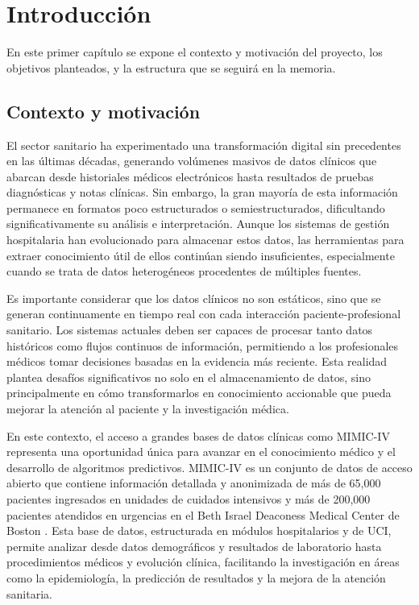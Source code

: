 \chapter{Introducción}

En este primer capítulo se expone el contexto y motivación del proyecto, los objetivos planteados, y la estructura que se seguirá en la memoria.

\section{Contexto y motivación}

El sector sanitario ha experimentado una transformación digital sin precedentes en las últimas décadas, generando volúmenes masivos de datos clínicos que abarcan desde historiales médicos electrónicos hasta resultados de pruebas diagnósticas y notas clínicas. Sin embargo, la gran mayoría de esta información permanece en formatos poco estructurados o semiestructurados, dificultando significativamente su análisis e interpretación. Aunque los sistemas de gestión hospitalaria han evolucionado para almacenar estos datos, las herramientas para extraer conocimiento útil de ellos continúan siendo insuficientes, especialmente cuando se trata de datos heterogéneos procedentes de múltiples fuentes.

Es importante considerar que los datos clínicos no son estáticos, sino que se generan continuamente en tiempo real con cada interacción paciente-profesional sanitario. Los sistemas actuales deben ser capaces de procesar tanto datos históricos como flujos continuos de información, permitiendo a los profesionales médicos tomar decisiones basadas en la evidencia más reciente. Esta realidad plantea desafíos significativos no solo en el almacenamiento de datos, sino principalmente en cómo transformarlos en conocimiento accionable que pueda mejorar la atención al paciente y la investigación médica.

En este contexto, el acceso a grandes bases de datos clínicas como MIMIC-IV representa una oportunidad única para avanzar en el conocimiento médico y el desarrollo de algoritmos predictivos. MIMIC-IV es un conjunto de datos de acceso abierto que contiene información detallada y anonimizada de más de 65,000 pacientes ingresados en unidades de cuidados intensivos y más de 200,000 pacientes atendidos en urgencias en el Beth Israel Deaconess Medical Center de Boston \cite{MIMICIV_paper, MIMICIV_dataset, PhysioNet_paper}. Esta base de datos, estructurada en módulos hospitalarios y de UCI, permite analizar desde datos demográficos y resultados de laboratorio hasta procedimientos médicos y evolución clínica, facilitando la investigación en áreas como la epidemiología, la predicción de resultados y la mejora de la atención sanitaria.

